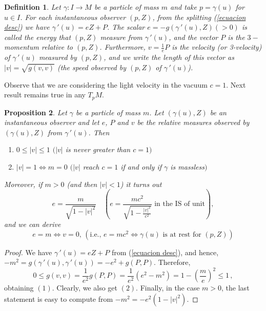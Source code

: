 \documentclass[11pt]{book}
\newtheorem{defi}{Definition}[chapter]
\newtheorem{pro}[defi]{Proposition}
\begin{document}
\begin{defi}
		Let $\gamma:I\to M$ be a particle of mass $m$ and take $p=\gamma(u)$ for $u\in I$. For each instantaneous observer $(p,Z)$, from the splitting (\ref{ecuacion desc}) we have $\gamma{\,'}(u)=eZ+P$. 
	The scalar $e=-g(\gamma{\,'}(u),Z)(>0)$ is called the energy that $(p,Z)$ measure from $\gamma{\,'}(u)$, and the vector $P$ is the $3-$momentum relative to $(p,Z)$. Furthermore, $v=\frac{1}{e}P$ is the velocity (or 3-velocity) of $\gamma{\,'}(u)$ measured by $(p,Z)$, and we write the length of this vector as $|v|=\sqrt{g(v,v)}$ (the speed observed by $(p,Z)$ of $\gamma{\,'}(u)$).
\end{defi}
	
Observe that we are considering the light velocity in the vacuum $c=1$. Next result remains true in any $T_pM$.
\begin{pro}\label{prop particula}
	Let $\gamma$ be a particle of mass $m$. Let $(\gamma(u),Z)$ be an instantaneous observer and let $e$, $P$ and $v$ be the relative measures observed by $(\gamma(u),Z)$ from $\gamma\,'(u)$. Then
	\begin{enumerate}
		\item[(1)] $0\le |v| \le 1$ $\big(|v|$ is never greater than $c=1\big)$
		\item[(2)] $|v|=1 \iff m=0$ $\big(|v|$ reach $c=1$ if and only if $\gamma$ is massless$\big)$
	\end{enumerate}
	Moreover, if $m>0$ (and then $|v|<1$) it turns out
	\[
	e=\frac{m}{\sqrt{1-|v|^2}} \quad \left(e=\frac{mc^2}{\sqrt{1-\frac{|v|^2}{c^2}}} \text{ in the IS of unit}\right),
	\]
	and we can derive
	\[
	e=m \iff v=0, \, \left(\text{i.e., } e=mc^2 \iff \gamma(u) \text{ is at rest for } (p,Z)\right)
	\]
\end{pro}
\begin{proof}
	We have $\gamma{\,'}(u)=eZ+P$ from (\ref{ecuacion desc}), and hence, $-m^2=g(\gamma{\,'}(u),\gamma{\,'}(u))=-e^2+g(P,P).$ Therefore,
	\[
	0\le g(v,v)=\frac{1}{e^2}g(P,P)=\frac{1}{e^2}(e^2-m^2)=1-\left(\frac{m}{e}\right)^2\le 1\,,
	\]
	obtaining $(1)$. Clearly, we also get $(2)$. Finally, in the case $m>0$, the last statement is easy to compute from $-m^2=-e^2(1-|v|^2)$.
\end{proof}	
\end{document}
